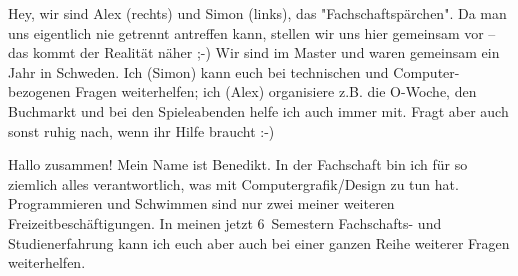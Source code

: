 \begin{multicols*}{2}

{%

Hey,
wir sind Alex (rechts) und Simon (links), das "Fachschaftspärchen". Da 
man uns eigentlich nie getrennt antreffen kann, stellen wir uns hier 
gemeinsam vor -- das kommt der Realität näher ;-)
Wir sind im Master und waren gemeinsam ein Jahr in Schweden. Ich (Simon) 
kann euch bei technischen und Computer-bezogenen Fragen weiterhelfen; 
ich (Alex) organisiere z.B. die O-Woche, den Buchmarkt und bei den 
Spieleabenden helfe ich auch immer mit. Fragt aber auch sonst ruhig 
nach, wenn ihr Hilfe braucht :-)
}
	
{Hallo zusammen! Mein Name ist Benedikt. In der Fachschaft bin ich für so ziemlich alles verantwortlich, was mit Computergrafik/Design zu tun hat. Programmieren und Schwimmen sind nur zwei meiner weiteren Freizeitbeschäftigungen. In meinen jetzt 6~Semestern Fachschafts- und Studienerfahrung kann ich euch aber auch bei einer ganzen Reihe weiterer Fragen weiterhelfen.}


\end{multicols*}
